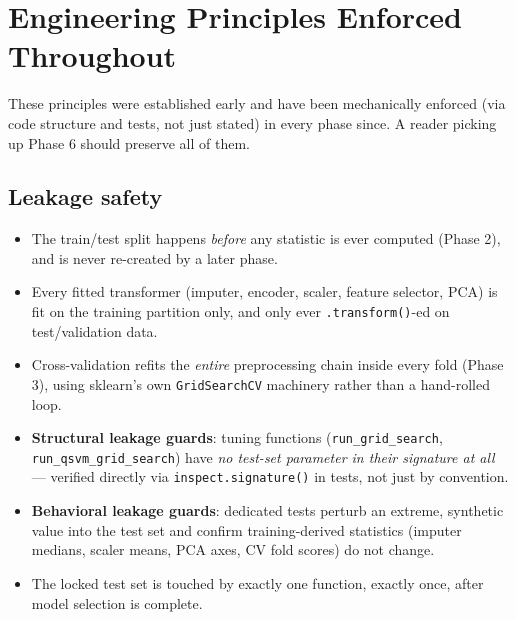 \documentclass[11pt,a4paper]{article}
\newcommand{\code}[1]{\texttt{\small #1}}
\begin{document}
\section{Engineering Principles Enforced Throughout}
\label{sec:principles}

These principles were established early and have been mechanically enforced (via code structure and tests, not just stated) in every phase since. A reader picking up Phase 6 should preserve all of them.

\subsection{Leakage safety}
\begin{itemize}[leftmargin=1.4em]
  \item The train/test split happens \emph{before} any statistic is ever computed (Phase 2), and is never re-created by a later phase.
  \item Every fitted transformer (imputer, encoder, scaler, feature selector, PCA) is fit on the training partition only, and only ever \code{.transform()}-ed on test/validation data.
  \item Cross-validation refits the \emph{entire} preprocessing chain inside every fold (Phase 3), using sklearn's own \code{GridSearchCV} machinery rather than a hand-rolled loop.
  \item \textbf{Structural leakage guards}: tuning functions (\code{run\_grid\_search}, \code{run\_qsvm\_grid\_search}) have \emph{no test-set parameter in their signature at all} --- verified directly via \code{inspect.signature()} in tests, not just by convention.
  \item \textbf{Behavioral leakage guards}: dedicated tests perturb an extreme, synthetic value into the test set and confirm training-derived statistics (imputer medians, scaler means, PCA axes, CV fold scores) do not change.
  \item The locked test set is touched by exactly one function, exactly once, after model selection is complete.
\end{itemize}
\end{document}
